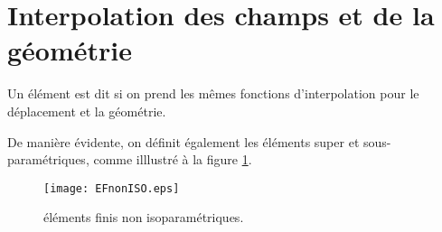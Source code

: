 \ifVersionAvecExemplesSepares\else
\fi

\medskip
\section{Interpolation des champs et de la géométrie}

Un élément est dit  si on prend les mêmes fonctions 
d'interpolation pour le déplacement et la géométrie.

De manière évidente, on définit également les éléments super et sous-paramétriques,
comme illlustré à la figure \ref{EFnonISO}.
\begin{figure}[ht]
\begin{center}
\texttt{[image: EFnonISO.eps]}
\end{center}
\caption{\label{EFnonISO} éléments finis non isoparamétriques.}
\end{figure}

